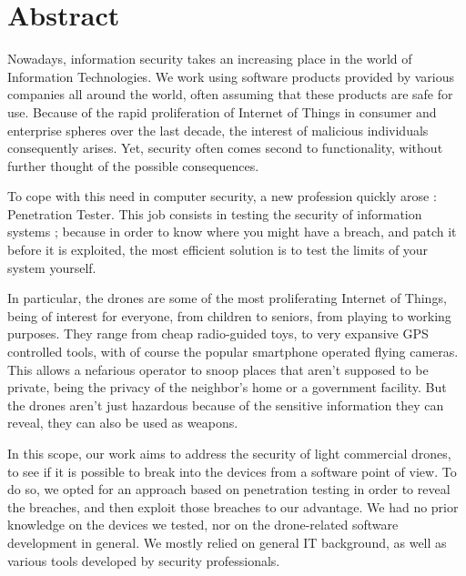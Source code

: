 \chapter*{Abstract}
\thispagestyle{empty}

\vspace{-3cm}
\vfill

\begin{center}
\begin{minipage}{15cm}
Nowadays, information security takes an increasing place in the world of Information Technologies. We work using software products provided by various companies all around the world, often assuming that these products are safe for use. Because of the rapid proliferation of Internet of Things in consumer and enterprise spheres over the last decade, the interest of malicious individuals consequently arises. Yet, security often comes second to functionality, without further thought of the possible consequences. 
\newline

To cope with this need in computer security, a new profession quickly arose : Penetration Tester. This job consists in testing the security of information systems ; because in order to know where you might have a breach, and patch it before it is exploited, the most efficient solution is to test the limits of your system yourself.
\newline

In particular, the drones are some of the most proliferating Internet of Things, being of interest for everyone, from children to seniors, from playing to working purposes. They range from cheap radio-guided toys, to very expansive GPS controlled tools, with of course the popular smartphone operated flying cameras. This allows a nefarious operator to snoop places that aren't supposed to be private, being the privacy of the neighbor's home or a government facility. But the drones aren't just hazardous because of the sensitive information they can reveal, they can also be used as weapons.
\newline

In this scope, our work aims to address the security of light commercial drones, to see if it is possible to break into the devices from a software point of view. To do so, we opted for an approach based on penetration testing in order to reveal the breaches, and then exploit those breaches to our advantage. We had no prior knowledge on the devices we tested, nor on the drone-related software development in general. We mostly relied on general IT background, as well as various tools developed by security professionals.
\newline


\end{minipage}
\end{center}
